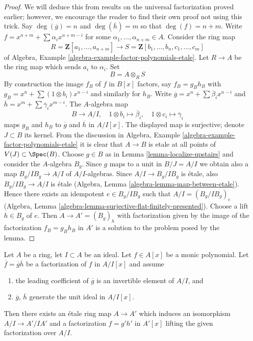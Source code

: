 \begin{proof}
We will deduce this from results on the universal factorization proved
earlier; however, we encourage the reader to find their own proof not
using this trick. Say $\deg(\overline{g}) = n$ and $\deg(\overline{h}) = m$ so
that $\deg(f) = n + m$. Write $f = x^{n + m} + \sum \alpha_i x^{n + m - i}$
for some $\alpha_1, \ldots, \alpha_{n + m} \in A$. Consider the ring map
$$
R = \mathbf{Z}[a_1, \ldots, a_{n + m}]
\longrightarrow
S = \mathbf{Z}[b_1, \ldots, b_n, c_1, \ldots, c_m]
$$
of Algebra, Example \ref{algebra-example-factor-polynomials-etale}.
Let $R \to A$ be the ring map which sends $a_i$ to $\alpha_i$.
Set
$$
B = A \otimes_R S
$$
By construction the image $f_B$ of $f$ in $B[x]$ factors, say
$f_B = g_B h_B$ with $g_B = x^n + \sum (1 \otimes b_i) x^{n - i}$
and similarly for $h_B$.
Write $\overline{g} = x^n + \sum \overline{\beta}_i x^{n - i}$ and
$\overline{h} = x^m + \sum \overline{\gamma}_i x^{m - i}$.
The $A$-algebra map
$$
B \longrightarrow A/I, \quad
1 \otimes b_i \mapsto \overline{\beta}_i, \quad
1 \otimes c_i \mapsto \overline{\gamma}_i
$$
maps $g_B$ and $h_B$ to $\overline{g}$ and $\overline{h}$ in $A/I[x]$.
The displayed map is surjective; denote $J \subset B$ its kernel.
From the discussion in 
Algebra, Example \ref{algebra-example-factor-polynomials-etale}
it is clear that $A \to B$ is etale at all points of $V(J) \subset \Spec(B)$.
Choose $g \in B$ as in Lemma \ref{lemma-localize-upstairs} and
consider the $A$-algebra $B_g$. Since $g$ maps to a unit
in $B/J = A/I$ we obtain also a map $B_g/I B_g \to A/I$ of $A/I$-algebras.
Since $A/I \to B_g/I B_g$ is \'etale, also $B_g/IB_g \to A/I$ is \'etale
(Algebra, Lemma \ref{algebra-lemma-map-between-etale}). Hence there exists an
idempotent $e \in B_g/I B_g$ such that $A/I = (B_g/I B_g)_e$
(Algebra, Lemma \ref{algebra-lemma-surjective-flat-finitely-presented}).
Choose a lift $h \in B_g$ of $e$. Then $A \to A' = (B_g)_h$ with
factorization given by the image of the factorization $f_B = g_B h_B$
in $A'$ is a solution to the problem posed by the lemma.
\end{proof}

\begin{lemma}
\label{lemma-lift-factorization-easy}
Let $A$ be a ring, let $I \subset A$ be an ideal. Let $f \in A[x]$ be a
monic polynomial. Let $\overline{f} = \overline{g} \overline{h}$ be a
factorization of $f$ in $A/I[x]$ and assume
\begin{enumerate}
\item the leading coefficient of $\overline{g}$ is an invertible element
of $A/I$, and
\item $\overline{g}$, $\overline{h}$ generate the unit ideal in $A/I[x]$.
\end{enumerate}
Then there exists an \'etale ring map $A \to A'$ which induces an
isomorphism $A/I \to A'/IA'$ and a factorization $f = g' h'$ in $A'[x]$
lifting the given factorization over $A/I$.
\end{lemma}

